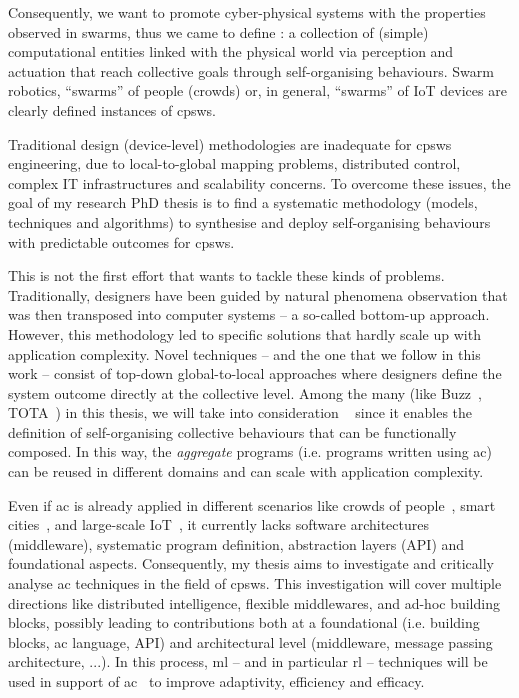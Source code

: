 \documentclass[11pt]{article}
\begin{document}
Consequently, we want to promote cyber-physical systems with the properties observed in swarms, thus we came to define : a collection of (simple) computational entities linked with the physical world via perception and actuation that reach collective goals through self-organising behaviours.
%
Swarm robotics, ``swarms” of people (crowds) or, in general, ``swarms” of IoT devices are clearly defined instances of \acp{cpsw}.

Traditional design (device-level) methodologies are inadequate for \acp{cpsw} engineering, due to local-to-global mapping problems, distributed control, complex IT infrastructures and scalability concerns.
%
To overcome these issues, the goal of my research PhD thesis is to find a systematic methodology (models, techniques and algorithms) to synthesise and deploy self-organising behaviours with predictable outcomes for \acp{cpsw}.

This is not the first effort that wants to tackle these kinds of problems. 
%
Traditionally, designers have been guided by natural phenomena observation that was then transposed into computer systems -- a so-called bottom-up approach. 
%
However, this methodology led to specific solutions that hardly scale up with application complexity.
%
Novel techniques -- and the one that we follow in this work -- consist of top-down global-to-local approaches where designers define the system outcome directly at the collective level.
%
Among the many (like Buzz~\cite{DBLP:journals/software/PinciroliB16}, TOTA~\cite{DBLP:conf/icdcsw/MameiZL03}) in this thesis, we will take into consideration ~\cite{DBLP:journals/computer/BealPV15} since it enables the definition of self-organising collective behaviours that can be functionally composed. 
%
In this way, the \textit{aggregate} programs (i.e. programs written using \ac{ac}) can be reused in different domains and can scale with application complexity. 

Even if \ac{ac} is already applied in different scenarios like crowds of people~\cite{DBLP:journals/computer/BealPV15}, smart cities~\cite{DBLP:journals/isci/CasadeiFPRSV19}, and large-scale IoT~\cite{DBLP:journals/fgcs/CasadeiFPRSV19}, it currently lacks software architectures (middleware), systematic program definition, abstraction layers (API) and foundational aspects.
%
Consequently, my thesis aims to investigate and critically analyse \ac{ac} techniques in the field of \acp{cpsw}.
%
This investigation will cover multiple directions like distributed intelligence, flexible middlewares, and ad-hoc building blocks, possibly leading to contributions both at a foundational (i.e. building blocks, \ac{ac} language, API) and architectural level (middleware, message passing architecture, ...).
%
In this process, \ac{ml} -- and in particular \ac{rl} -- techniques will be used in support of \ac{ac}~\cite{research} to improve adaptivity, efficiency and efficacy.
\end{document}
